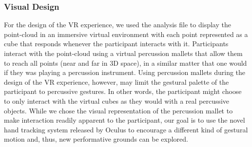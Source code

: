 \documentclass{nime-alternate}
\begin{document}
\subsubsection{Visual Design}

For the design of the VR experience, we used the analysis file to display the point-cloud in an immersive virtual environment with each point represented as a cube that responds whenever the participant interacts with it. Participants interact with the point-cloud using a virtual percussion mallets that allow them to reach all points (near and far in 3D space), in a similar matter that one would if they was playing a percussion instrument. Using percussion mallets during the design of the VR experience, however, may limit the gestural palette of the participant to percussive gestures. In other words, the participant might choose to only interact with the virtual cubes as they would with a real percussive objects. While we chose the visual representation of the percussion mallet to make interaction readily apparent to the participant, our goal is to use the novel hand tracking system released by Oculus to encourage a different kind of gestural motion and, thus, new performative grounds can be explored. 

\end{document}
